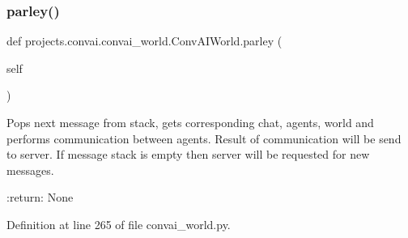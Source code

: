 \subsubsection{\texorpdfstring{parley()}{parley()}}
{\footnotesize\ttfamily def projects.\+convai.\+convai\+\_\+world.\+Conv\+A\+I\+World.\+parley (\begin{DoxyParamCaption}\item[{}]{self }\end{DoxyParamCaption})}

\begin{DoxyVerb}Pops next message from stack, gets corresponding chat, agents, world and
performs communication between agents. Result of communication will be send to
server. If message stack is empty then server will be requested for new
messages.

:return: None
\end{DoxyVerb}
 

Definition at line 265 of file convai\+\_\+world.\+py.


